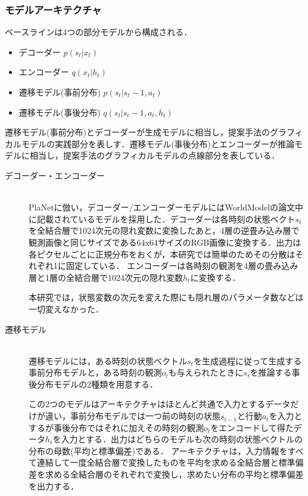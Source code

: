 \documentclass[10pt, twocolumn]{jarticle}
\begin{document}
\subsubsection{モデルアーキテクチャ}
ベースラインは4つの部分モデルから構成される．
\begin{itemize}
    \item デコーダー $p(s_t|x_t)$
    \item エンコーダー $q(x_t|h_t)$
    \item 遷移モデル(事前分布) $p(s_t|s_t-1, a_t)$
    \item 遷移モデル(事後分布) $q(s_t|s_t-1, a_t, h_t)$
\end{itemize}

遷移モデル(事前分布)とデコーダーが生成モデルに相当し，提案手法のグラフィカルモデルの実践部分を表しす．遷移モデル(事後分布)とエンコーダーが推論モデルに相当し，提案手法のグラフィカルモデルの点線部分を表している．

\begin{description}
    \item[デコーダー・エンコーダー]\mbox{}\\
PlaNetに倣い，デコーダー/エンコーダーモデルにはWorldModel\cite{ha1803world}の論文中に記載されているモデルを採用した．デコーダーは各時刻の状態ベクト$s_t$を全結合層で1024次元の隠れ変数に変換したあと，4層の逆畳み込み層で観測画像と同じサイズである64x64サイズのRGB画像に変換する．出力は各ピクセルごとに正規分布をおくが，本研究では簡単のためその分散はそれぞれ1に固定している．
エンコーダーは各時刻の観測を4層の畳み込み層と1層の全結合層で1024次元の隠れ変数$h_t$に変換する．

本研究では，状態変数の次元を変えた際にも隠れ層のパラメータ数などは一切変えなかった．

    \item[遷移モデル]\mbox{}\\
遷移モデルには，ある時刻の状態ベクトル$s_t$を生成過程に従って生成する事前分布モデルと，ある時刻の観測$o_t$も与えられたときに$s_t$を推論する事後分布モデルの2種類を用意する．

この2つのモデルはアーキテクチャはほとんど共通で入力とするデータだけが違い，事前分布モデルでは一つ前の時刻の状態$s_{t-1}$と行動$a_t$を入力とするが事後分布ではそれに加えその時刻の観測$o_t$をエンコードして得たデータ$h_t$を入力とする．出力はどちらのモデルも次の時刻の状態ベクトルの分布の母数(平均と標準偏差)である．
アーキテクチャは，入力情報をすべて連結して一度全結合層で変換したものを平均を求める全結合層と標準偏差を求める全結合層のそれぞれで変換し，求めたい分布の平均と標準偏差を出力する．

\end{description}
\end{document}
